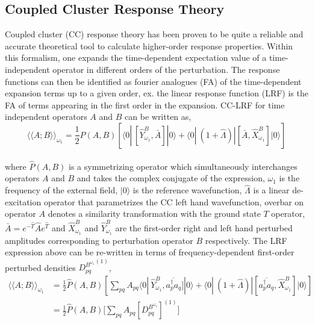 \subsection{Coupled Cluster Response Theory}
Coupled cluster (CC) response theory has been proven to be quite a reliable and accurate theoretical
tool to calculate higher-order response properties\cite{}. Within this formalism,
one expands the time-dependent expectation value of a time-independent operator 
in different orders of the perturbation. The response functions can then be identified 
as fourier analogues (FA) of the time-dependent expansion terms up to a given order, ex. the
linear response function (LRF) is the FA of terms appearing in the first order in the
expansion. CC-LRF for time independent operators $A$ and $B$ can be written as\cite{},
\\
\begin{equation}
{\langle\langle A;B\rangle\rangle}_{\omega_1} =  \frac{1}{2}\hat{P}(A,B)[\langle 0 | \
[\hat{Y}^{B}_{\omega_1}, \bar{A}]|0\rangle + \langle 0 | \
(1 + \hat{\Lambda})|[\bar{A},\hat{X}^{B}_{\omega_1}]|0\rangle]
\end{equation}
\\
where $\hat{P}(A,B)$ is a symmetrizing operator which simultaneously interchanges 
operators $A$ and $B$ and takes the complex conjugate of the expression, $\omega_1$ 
is the frequency of the external field, $|0\rangle$ is the reference wavefunction, $\hat{\Lambda}$ is
a linear de-excitation operator that parametrizes the CC left hand wavefunction, 
overbar on operator $A$ denotes a similarity transformation with the ground state 
$T$ operator, $\bar{A} = e^{-\hat{T}}\hat{A}e^{\hat{T}}$ and $\hat{X}^{B}_{\omega_1}$ 
and $\hat{Y}^{B}_{\omega_1}$ are the first-order right and left hand perturbed 
amplitudes corresponding to perturbation operator $B$ respectively.
The LRF expression above can be re-written in terms of frequency-dependent first-order 
perturbed densities ${D^{B^{\omega_1}}_{pq}}^{(1)}$, 
\\
\begin{equation}
\begin{split}
{\langle\langle A;B\rangle\rangle}_{\omega_1} & =  \frac{1}{2}\hat{P}(A,B)[\sum_{pq}A_{pq}\langle 0 | \
\hat{Y}^{B}_{\omega_1}, \overbar{a^{\dagger}_{p}a_q}]|0\rangle + \langle 0 | \
(1 + \hat{\Lambda})|[\overbar{a^{\dagger}_{p}a_q},\hat{X}^{B}_{\omega_1}]|0\rangle] \\
& = \frac{1}{2}\hat{P}(A,B) \big[\sum_{pq} A_{pq}[{D^{B^{\omega_1}}_{pq}}]^{(1)}\big]
\end{split}
\end{equation}
